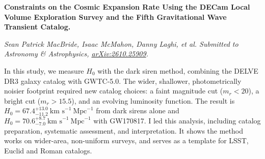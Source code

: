 \documentclass[12pt]{article}
\begin{document}
\textbf{Constraints on the Cosmic Expansion Rate Using the DECam Local Volume Exploration Survey and the Fifth Gravitational Wave Transient Catalog.} 

\textit{Sean Patrick MacBride, Isaac McMahon, Danny Laghi, et al. Submitted to Astronomy \& Astrophysics, \href{https://arxiv.org/abs/2610.25909}{arXiv:2610.25909}.}

In this study, we measure $H_0$ with the dark siren method, combining the DELVE DR3 galaxy catalog with GWTC-5.0. The wider, shallower, photometrically noisier footprint required new catalog choices: a faint magnitude cut ($m_r < 20$), a bright cut ($m_r > 15.5$), and an evolving luminosity function. The result is $H_0 = 67.4^{+13.0}_{-11.2}\ \text{km s}^{-1}\ \text{Mpc}^{-1}$ from dark sirens alone and $H_0 = 70.6^{+8.7}_{-7.0}\ \text{km s}^{-1}\ \text{Mpc}^{-1}$ with GW170817. I led this analysis, including catalog preparation, systematic assessment, and interpretation. It shows the method works on wider-area, non-uniform surveys, and serves as a template for LSST, Euclid and Roman catalogs.
\end{document}
